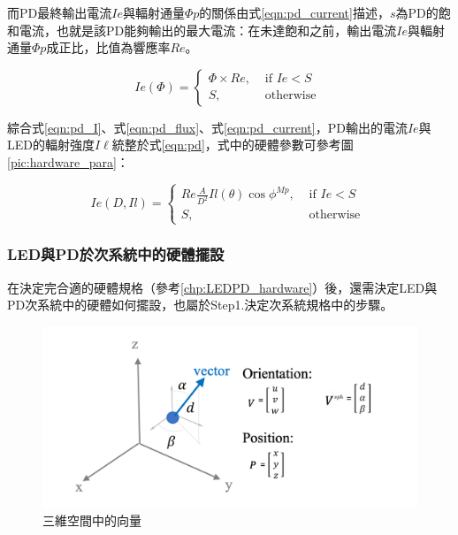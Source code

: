                 而PD最終輸出電流$Ie$與輻射通量$\Phi p$的關係由式\ref{eqn:pd_current}描述，$s$為PD的飽和電流，也就是該PD能夠輸出的最大電流：在未達飽和之前，輸出電流$Ie$與輻射通量$\Phi p$成正比，比值為響應率$Re$。

                \begin{equation}
                    \label{eqn:pd_current}
                    Ie(\Phi) = \begin{cases}\Phi\times Re, & \text { if } Ie<S \\ S, & \text { otherwise }\end{cases}
                \end{equation}

                綜合式\ref{eqn:pd_I}、式\ref{eqn:pd_flux}、式\ref{eqn:pd_current}，PD輸出的電流$Ie$與LED的輻射強度$I\ell$統整於式\ref{eqn:pd}，式中的硬體參數可參考圖\ref{pic:hardware_para}：

                \begin{equation}
                    \label{eqn:pd}
                    Ie(D,Il) = \begin{cases}Re \frac{A}{D^2}Il(\theta) \cos \phi^{Mp}, & \text { if } Ie<S \\ S, & \text { otherwise }\end{cases}
                \end{equation}
         

            
            
        

            

    \subsubsection{LED與PD於次系統中的硬體擺設}
        \label{chp:config}


        

        在決定完合適的硬體規格（參考\ref{chp:LEDPD_hardware}）後，還需決定LED與PD次系統中的硬體如何擺設，也屬於Step1.決定次系統規格中的步驟。

        \begin{figure}[htpb]
            \centering
            \includegraphics[width=12cm]{ch2pic/vec_config.png}
            \caption{三維空間中的向量}
            \label{pic:vec_config}
        \end{figure}
        
